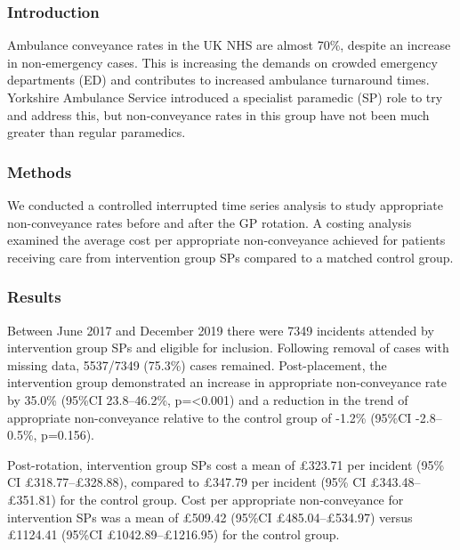 \documentclass[
  a4paper,
  openany]{article}
\begin{document}
\hypertarget{introduction}{%
\subsubsection*{Introduction}\label{introduction}}

Ambulance conveyance rates in the UK NHS are almost 70\%, despite an increase in non-emergency cases. This is increasing the demands on crowded emergency departments (ED) and contributes to increased ambulance turnaround times. Yorkshire Ambulance Service introduced a specialist paramedic (SP) role to try and address this, but non-conveyance rates in this group have not been much greater than regular paramedics.

\hypertarget{methods}{%
\subsubsection*{Methods}\label{methods}}

We conducted a controlled interrupted time series analysis to study appropriate non-conveyance rates before and after the GP rotation. A costing analysis examined the average cost per appropriate non-conveyance achieved for patients receiving care from intervention group SPs compared to a matched control group.

\hypertarget{results}{%
\subsubsection*{Results}\label{results}}

Between June 2017 and December 2019 there were 7349 incidents attended by intervention group SPs and eligible for inclusion. Following removal of cases with missing data, 5537/7349 (75.3\%) cases remained. Post-placement, the intervention group demonstrated an increase in appropriate non-conveyance rate by 35.0\% (95\%CI 23.8--46.2\%, p=\textless0.001) and a reduction in the trend of appropriate non-conveyance relative to the control group of -1.2\% (95\%CI -2.8--0.5\%, p=0.156).

Post-rotation, intervention group SPs cost a mean of £323.71 per incident (95\% CI £318.77--£328.88), compared to £347.79 per incident (95\% CI £343.48--£351.81) for the control group. Cost per appropriate non-conveyance for intervention SPs was a mean of £509.42 (95\%CI £485.04--£534.97) versus £1124.41 (95\%CI £1042.89--£1216.95) for the control group.
\end{document}
